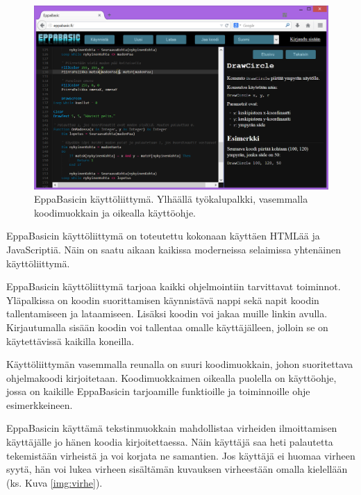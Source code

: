 \begin{figure}[h]
    \centering
    \includegraphics[width=1\textwidth]{kayttoliittyma}
    \caption{EppaBasicin käyttöliittymä. Ylhäällä työkalupalkki, vasemmalla koodimuokkain ja oikealla käyttöohje.}
    \label{img:kayttoliittyma}
\end{figure}

EppaBasicin käyttöliittymä on toteutettu
kokonaan käyttäen HTMLää ja JavaScriptiä.
Näin on saatu aikaan kaikissa moderneissa
selaimissa yhtenäinen käyttöliittymä.

EppaBasicin käyttöliittymä tarjoaa kaikki
ohjelmointiin tarvittavat toiminnot.
Yläpalkissa on koodin suorittamisen käynnistävä
nappi sekä napit koodin tallentamiseen ja lataamiseen.
Lisäksi koodin voi jakaa muille linkin avulla.
Kirjautumalla sisään koodin voi tallentaa
omalle käyttäjälleen, jolloin se on käytettävissä
kaikilla koneilla.

Käyttöliittymän vasemmalla reunalla on
suuri koodimuokkain, johon suoritettava
ohjelmakoodi kirjoitetaan.
Koodimuokkaimen oikealla puolella on
käyttöohje, jossa on kaikille
EppaBasicin tarjoamille funktioille
ja toiminnoille ohje esimerkkeineen.

EppaBasicin käyttämä tekstinmuokkain mahdollistaa
virheiden ilmoittamisen käyttäjälle jo hänen
koodia kirjoitettaessa.
Näin käyttäjä saa heti palautetta tekemistään
virheistä ja voi korjata ne samantien.
Jos käyttäjä ei huomaa virheen syytä,
hän voi lukea virheen sisältämän
kuvauksen virheestään omalla kielellään
(ks. Kuva \ref{img:virhe}).

